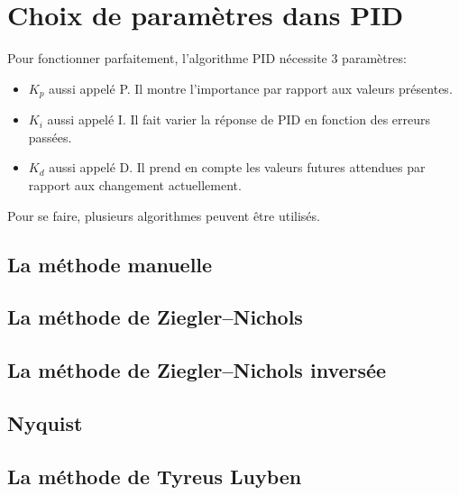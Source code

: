 \section{Choix de paramètres dans PID}
Pour fonctionner parfaitement, l'algorithme PID nécessite 3 paramètres:
\begin{itemize}
\item $K_p$ aussi appelé P. Il montre l'importance par rapport aux valeurs présentes.
\item $K_i$ aussi appelé I. Il fait varier la réponse de PID en fonction des erreurs passées.
\item $K_d$ aussi appelé D. Il prend en compte les valeurs futures attendues par rapport aux changement actuellement.
\end{itemize}
 Pour se faire, plusieurs algorithmes peuvent être utilisés.
 \subsection{La méthode manuelle}
 
 \subsection{La méthode de Ziegler–Nichols}
 
 \subsection{La méthode de Ziegler–Nichols inversée}

 \subsection{Nyquist} 

 \subsection{La méthode de Tyreus Luyben}
 
 
